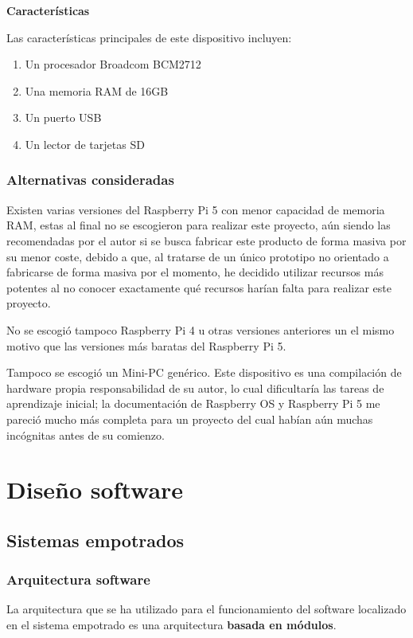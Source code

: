 \documentclass[12pt,a4paper,twoside,openright]{book}
\begin{document}
\textbf{Características}

Las características principales de este dispositivo incluyen:

\begin{enumerate}
  \item Un procesador Broadcom BCM2712
  \item Una memoria RAM de 16GB
  \item Un puerto USB
  \item Un lector de tarjetas SD
\end{enumerate}

\subsubsection{Alternativas consideradas}

Existen varias versiones del Raspberry Pi 5 con menor capacidad de memoria RAM, estas al final no se escogieron para realizar este proyecto, aún siendo las recomendadas por el autor si se busca fabricar este producto de forma masiva por su menor coste, debido a que, al tratarse de un único prototipo no orientado a fabricarse de forma masiva por el momento, he decidido utilizar recursos más potentes al no conocer exactamente qué recursos harían falta para realizar este proyecto.

No se escogió tampoco Raspberry Pi 4 u otras versiones anteriores un el mismo motivo que las versiones más baratas del Raspberry Pi 5.

Tampoco se escogió un Mini-PC genérico. Este dispositivo es una compilación de hardware propia responsabilidad de su autor, lo cual dificultaría las tareas de aprendizaje inicial; la documentación de Raspberry OS y Raspberry Pi 5 me pareció mucho más completa para un proyecto del cual habían aún muchas incógnitas antes de su comienzo.

\section{Diseño software}
\subsection{Sistemas empotrados}

\subsubsection{Arquitectura software}

La arquitectura que se ha utilizado para el funcionamiento del software localizado en el sistema empotrado es una arquitectura \textbf{basada en módulos}.
\end{document}
